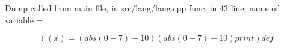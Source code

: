 \documentclass{article}
\begin{document}
Dump called from main file, in src/lang/lang.cpp func, in 43 line, name of variable = 


$$
((x) = ( abs (0 - 7) + 10)( abs (0 - 7) + 10) print ) def 
$$
\end{document}
